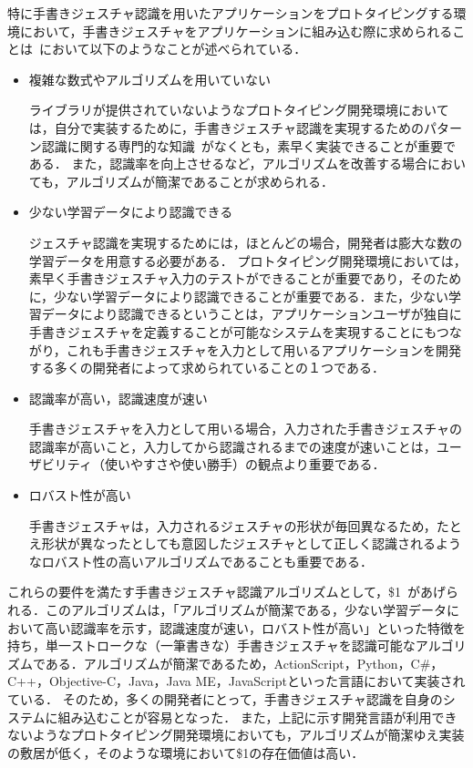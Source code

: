 特に手書きジェスチャ認識を用いたアプリケーションをプロトタイピングする環境において，手書きジェスチャをアプリケーションに組み込む際に求められることは~\cite{Rettig:1994:PTF:175276.175288}において以下のようなことが述べられている．
\begin{itemize}
 \item 複雑な数式やアルゴリズムを用いていない

ライブラリが提供されていないようなプロトタイピング開発環境においては，自分で実装するために，手書きジェスチャ認識を実現するためのパターン認識に関する専門的な知識~\cite{Hong00constructingfinite, Anderson2004HiddenMM,Sezgin:2005:HES:1040830.1040899, Cao:2005:EOA:1089508.1089540, Pittman:1991:RHT:108844.108914, Cho:2006:NGR:1711617.1711649,Rubine:1991:SGE:127719.122753, Anthony:2010:LMR:1839214.1839258}がなくとも，素早く実装できることが重要である．
また，認識率を向上させるなど，アルゴリズムを改善する場合においても，アルゴリズムが簡潔であることが求められる．

\item 少ない学習データにより認識できる

ジェスチャ認識を実現するためには，ほとんどの場合，開発者は膨大な数の学習データを用意する必要がある．
プロトタイピング開発環境においては，素早く手書きジェスチャ入力のテストができることが重要であり，そのために，少ない学習データにより認識できることが重要である．また，少ない学習データにより認識できるということは，アプリケーションユーザが独自に手書きジェスチャを定義することが可能なシステムを実現することにもつながり，これも手書きジェスチャを入力として用いるアプリケーションを開発する多くの開発者によって求められていることの１つである．

\item 認識率が高い，認識速度が速い

手書きジェスチャを入力として用いる場合，入力された手書きジェスチャの認識率が高いこと，入力してから認識されるまでの速度が速いことは，ユーザビリティ（使いやすさや使い勝手）の観点より重要である．

\item ロバスト性が高い

手書きジェスチャは，入力されるジェスチャの形状が毎回異なるため，たとえ形状が異なったとしても意図したジェスチャとして正しく認識されるようなロバスト性の高いアルゴリズムであることも重要である．
\end{itemize}

これらの要件を満たす手書きジェスチャ認識アルゴリズムとして，\$1~\cite{Wobbrock:2007:GWL:1294211.1294238}があげられる．このアルゴリズムは，「アルゴリズムが簡潔である，少ない学習データにおいて高い認識率を示す，認識速度が速い，ロバスト性が高い」といった特徴を持ち，単一ストロークな（一筆書きな）手書きジェスチャを認識可能なアルゴリズムである．アルゴリズムが簡潔であるため，ActionScript，Python，C\#，C++，Objective-C，Java，Java ME，JavaScriptといった言語において実装されている．
そのため，多くの開発者にとって，手書きジェスチャ認識を自身のシステムに組み込むことが容易となった．
また，上記に示す開発言語が利用できないようなプロトタイピング開発環境においても，アルゴリズムが簡潔ゆえ実装の敷居が低く，そのような環境において\$1の存在価値は高い．

